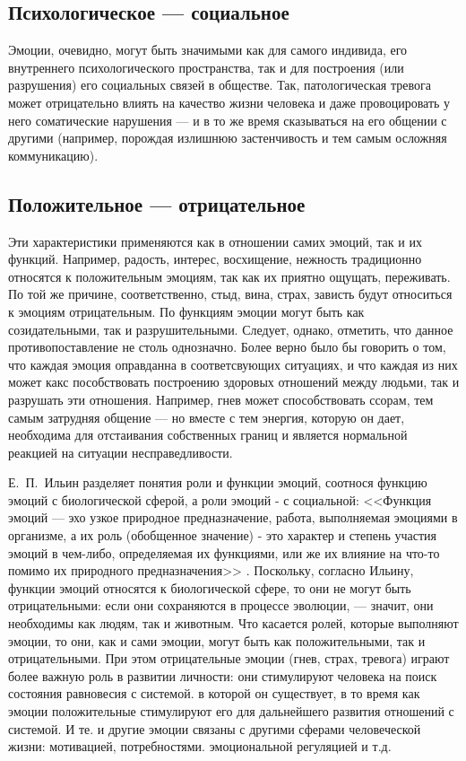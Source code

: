 \documentclass{../../common/thesisbyxetex}
\begin{document}
\subsection*{Психологическое --- социальное}

Эмоции, очевидно, могут быть значимыми как для самого индивида, его внутреннего 
психологического пространства, так и для построения (или разрушения) его социальных связей в 
обществе. Так, патологическая тревога может отрицательно влиять на качество жизни 
человека и даже провоцировать у него соматические нарушения --- и в то же время сказываться на его 
общении с другими (например, порождая излишнюю застенчивость и тем самым осложняя коммуникацию).

\subsection* {Положительное --- отрицательное}

Эти характеристики применяются как в отношении самих эмоций, так и их функций. Например, радость, 
интерес, восхищение, нежность традиционно относятся к положительным эмоциям, так как их приятно 
ощущать, переживать. По той же причине, соответственно, стыд, вина, страх, зависть будут относиться 
к эмоциям отрицательным. По функциям эмоции могут быть как созидательными, так и разрушительными.
Следует, однако, отметить, что данное противопоставление не столь однозначно. Более верно было бы 
говорить о том, что каждая эмоция оправданна в соответсвующих ситуациях, и что каждая из них может 
какс пособствовать построению здоровых отношений между людьми, так и разрушать эти отношения. 
Например, гнев может способствовать ссорам, тем самым затрудняя общение --- но вместе с тем 
энергия, которую он дает, необходима для отстаивания собственных границ и является нормальной 
реакцией на ситуации несправедливости.

Е.~П.~Ильин разделяет понятия роли и функции эмоций, соотнося функцию эмоций с биологической 
сферой, а роли эмоций - с социальной: <<Функция эмоций — эхо узкое природное предназначение, 
работа, 
выполняемая эмоциями в организме, а их роль (обобщенное значение) - это характер и степень участия 
эмоций в чем-либо, определяемая их функциями, или же их влияние на что-то помимо их природного 
предназначения>> \cite[100]{ilemo}. 
Поскольку, согласно Ильину, функции эмоций относятся к биологической сфере, то они не могут быть 
отрицательными: если они сохраняются в процессе эволюции, --- значит, они необходимы как людям, так 
и животным. Что касается ролей, которые выполняют эмоции, то они, как и сами эмоции, могут быть как 
положительными, так и отрицательными. При этом отрицательные эмоции (гнев, страх, тревога) играют 
более важную роль в развитии личности: они стимулируют человека на поиск состояния равновесия с 
системой. в которой он существует, в то время как эмоции положительные стимулируют его для 
дальнейшего развития отношений с системой. И те. и другие эмоции связаны с другими сферами 
человеческой жизни: мотивацией, потребностями. эмоциональной регуляцией и т.д.
\end{document}
